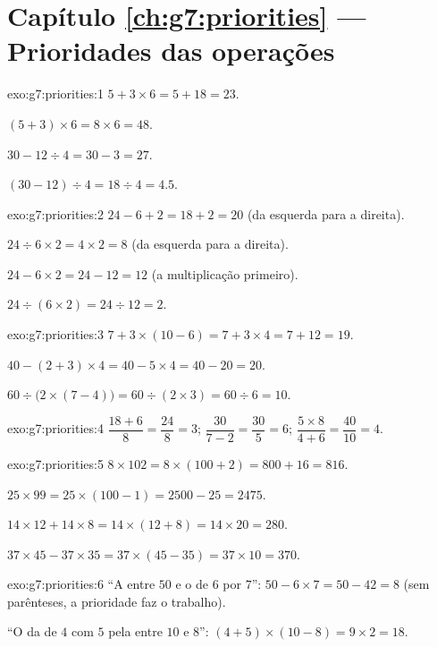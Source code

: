 \section*{Capítulo \ref{ch:g7:priorities} --- Prioridades das operações}

\begin{solution}{exo:g7:priorities:1}
$5 + 3 \times 6 = 5 + 18 = 23$.

$(5 + 3) \times 6 = 8 \times 6 = 48$.

$30 - 12 \div 4 = 30 - 3 = 27$.

$(30 - 12) \div 4 = 18 \div 4 = 4.5$.
\end{solution}

\begin{solution}{exo:g7:priorities:2}
$24 - 6 + 2 = 18 + 2 = 20$ (da esquerda para a direita).

$24 \div 6 \times 2 = 4 \times 2 = 8$ (da esquerda para a direita).

$24 - 6 \times 2 = 24 - 12 = 12$ (a multiplicação primeiro).

$24 \div (6 \times 2) = 24 \div 12 = 2$.
\end{solution}

\begin{solution}{exo:g7:priorities:3}
$7 + 3 \times (10 - 6) = 7 + 3 \times 4 = 7 + 12 = 19$.

$40 - (2 + 3) \times 4 = 40 - 5 \times 4 = 40 - 20 = 20$.

$60 \div \bigl(2 \times (7 - 4)\bigr) = 60 \div (2 \times 3)
= 60 \div 6 = 10$.
\end{solution}

\begin{solution}{exo:g7:priorities:4}
$\dfrac{18 + 6}{8} = \dfrac{24}{8} = 3$; \quad
$\dfrac{30}{7 - 2} = \dfrac{30}{5} = 6$; \quad
$\dfrac{5 \times 8}{4 + 6} = \dfrac{40}{10} = 4$.
\end{solution}

\begin{solution}{exo:g7:priorities:5}
$8 \times 102 = 8 \times (100 + 2) = 800 + 16 = 816$.

$25 \times 99 = 25 \times (100 - 1) = 2500 - 25 = 2475$.

$14 \times 12 + 14 \times 8 = 14 \times (12 + 8) = 14 \times 20 = 280$.

$37 \times 45 - 37 \times 35 = 37 \times (45 - 35) = 37 \times 10 =
370$.
\end{solution}

\begin{solution}{exo:g7:priorities:6}
``A  entre $50$ e o  de $6$ por $7$'':
$50 - 6 \times 7 = 50 - 42 = 8$ (sem parênteses, a prioridade faz o
trabalho).

``O  da  de $4$ com $5$ pela  entre $10$ e $8$'':
$(4 + 5) \times (10 - 8) = 9 \times 2 = 18$.
\end{solution}

